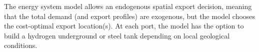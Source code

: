The energy system model allows an endogenous spatial export decision, meaning that the total demand (and export profiles) are exogenous, but the model chooses the  cost-optimal export location(s). At each port, the model has the option to build a hydrogen underground or steel tank depending on local geological conditions.









